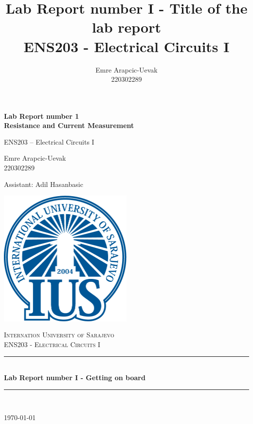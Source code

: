 \documentclass[a4paper, 10pt]{article}
\title{Lab Report number I - Title of the lab report\\
	ENS203 - Electrical Circuits I}
\author{Emre Arapcic-Uevak\\220302289}
\date{}
\begin{document}
	\begin{titlepage}
		\begin{center}

			{\Large\bfseries Lab Report number 1 \\[0.5em] Resistance and Current Measurement\par}
			\vspace{1cm} %

			{\large ENS203 – Electrical Circuits I\par}
			\vspace{1cm} %

			{\large Emre Arapcic-Uevak \\ 220302289\par}
			\vspace{1cm} %

			{\large Assistant: Adil Hasanbasic\par}
			\includegraphics[width=0.5\textwidth]{Logo.png}
			\vspace{5mm}
			
			\textsc{\LARGE Internation University of Sarajevo}\\[1.5cm]
			\textsc{\Large ENS203 - Electrical Circuits I}\\[0.5cm]
			
			\rule{\linewidth}{0.5mm} \\[0.4cm]
			{ \huge \bfseries Lab Report number I - Getting on board}\\[0.4cm]
			\rule{\linewidth}{0.5mm} \\[1.5cm]
			
			\vfill
			
			{\large \today}
		\end{center}
	\end{titlepage}
	\pagebreak
\end{document}
